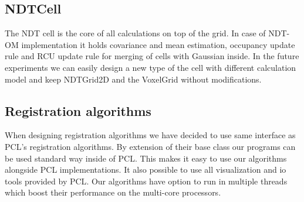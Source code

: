 \subsection{NDTCell}
The \gls{NDT} cell is the core of all calculations on top of the grid. In case of \gls{NDT-OM} implementation it holds covariance and mean estimation, occupancy update rule and \gls{RCU} update rule for merging of cells with Gaussian inside. In the future experiments we can easily design a new type of the cell with different calculation model and keep NDTGrid2D and the VoxelGrid without modifications.
\subsection{Registration algorithms}
When designing registration algorithms we have decided to use same interface as \gls{PCL}'s registration algorithms. By extension of their base class our programs can be used standard way inside of \gls{PCL}. This makes it easy to use our algorithms alongside \gls{PCL} implementations. It also possible to use all visualization and io tools provided by \gls{PCL}. Our algorithms have option to run in multiple threads which boost their performance on the multi-core processors. 

